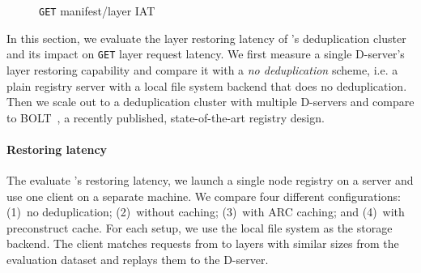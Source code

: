 \begin{figure}[t]
\begin{minipage}{0.3\textwidth}
	\caption{\texttt{GET} manifest/layer IAT 
	}
	\label{fig:eval-durationML}
   \end{minipage}
\end{figure}

In this section, we evaluate the layer restoring latency of \sysname's deduplication cluster 
and its impact on \texttt{GET} layer request latency.
%
We first measure a single D-server's layer restoring capability and compare it with 
a \emph{no deduplication} scheme, i.e.  a plain registry server with a local file system backend
that does no deduplication.
%
Then we scale out to a deduplication cluster with multiple D-servers and compare
\sysname to BOLT~\cite{littley2019bolt}, a recently published, state-of-the-art registry design.
%
%
%

\paragraph{Restoring latency}
%
%
The evaluate \sysname{}'s restoring latency, we launch a single node registry on a server
and use one client on a separate machine.
%
We compare four different configurations:
(1)~no deduplication;
(2)~\sysname without caching;
(3)~\sysname with ARC caching; and
(4)~\sysname with preconstruct cache.
%
For each setup, we use the local file system as the storage backend.
%
%
The client matches requests from \dal to layers with similar sizes 
from the evaluation dataset and replays them to the D-server.

